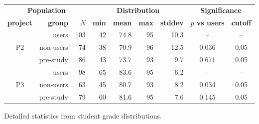 \begin{figure}[t]
	\begin{center}
		\small
	\begin{tabular}{cr|r||r|r|r|r||cc}
		\multicolumn{3}{c||}{\bf Population} & \multicolumn{4}{c||}{\bf Distribution} & \multicolumn{2}{c}{\bf Significance} \\
		\bf project & \bf group & $N$ & \bf min & \bf mean & \bf max & \bf stddev & \bf $p$ vs users & \bf cutoff\\
		\hline
			& users		& 103	& 42	& 74.8	& 95	& 10.3	& --	& --	\\
		P2	& non-users	& 74	& 38	& 70.9	& 96	& 12.5	& 0.036	& 0.05	\\
			& pre-study	& 86	& 43	& 73.7	& 93	& 9.7	& 0.671	& 0.05	\\
			\hline
			& users		& 98	& 65	& 83.6	& 95	& 6.2	& --	& --	\\
		P3	& non-users	& 63	& 45	& 80.7	& 93	& 8.2	& 0.034	& 0.05	\\
			& pre-study	& 79	& 60	& 81.6	& 95	& 7.6	& 0.145	& 0.05	\\
	\end{tabular}
	\end{center}
	\caption{Detailed statistics from student grade distributions.}
	\label{tab:table-of-ze-studence}
\end{figure}

